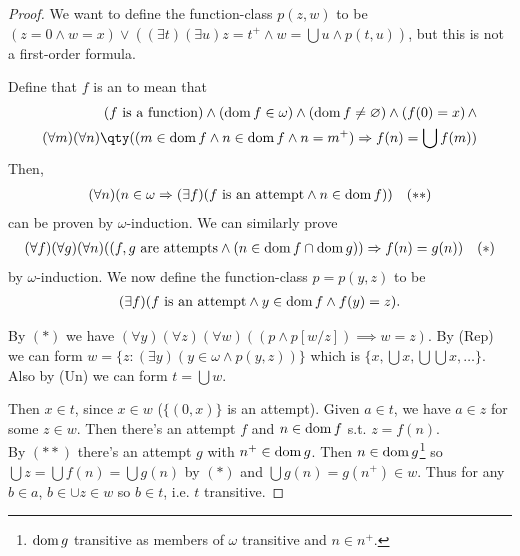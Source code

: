 \begin{proof}
    We want to define the function-class $p(z,w)$ to be $(z = 0 \wedge w = x) \vee ((\exists t)(\exists u) z = t^+ \wedge w = \bigcup u \wedge p(t,u))$, but this is not a first-order formula.

    Define that $f$ is an  to mean that
    \begin{align*}
        (f \text{ is a function}) \wedge (\dom f \in \omega) \wedge (\dom f \neq \varnothing) \wedge (f(0) = x)\, \wedge \\
        (\forall m)(\forall n)\qty((m \in \dom f \wedge n \in \dom f \wedge n = m^+) \implies f(n) = \bigcup f(m))
    \end{align*}
    Then,
    \begin{align*}
        (\forall n)(n \in \omega \Rightarrow (\exists f)(f \text{ is an attempt} \wedge n \in \operatorname{dom} f)) \quad (\ast\ast)
    \end{align*}
    can be proven by $\omega$-induction.
    We can similarly prove
    \begin{align*}
        (\forall f)(\forall g)(\forall n)((f, g \text{ are attempts} \wedge (n \in \operatorname{dom} f \cap \operatorname{dom} g)) \Rightarrow f(n) = g(n)) \quad (\ast)
    \end{align*}
    by $\omega$-induction.
    We now define the function-class $p = p(y, z)$ to be
    \begin{align*}
        (\exists f)(f \text{ is an attempt} \wedge y \in \operatorname{dom} f \wedge f(y) = z).
    \end{align*}

    By $(\ast)$ we have $(\forall y)(\forall z)(\forall w)((p \wedge p[w/z]) \implies w = z)$.
    By (Rep) we can form $w = \{z : (\exists y)(y \in \omega \wedge p(y, z))\}$ which is $\{x, \bigcup x, \bigcup \bigcup x, \dots\}$.
    Also by (Un) we can form $t = \bigcup w$.

    Then $x \in t$, since $x \in w$ ($\{(0, x)\}$ is an attempt).
    Given $a \in t$, we have $a \in z$ for some $z \in w$.
    Then there's an attempt $f$ and $n \in \operatorname{dom} f$ s.t. $z = f(n)$. \\
    By $(\ast\ast)$ there's an attempt $g$ with $n^+ \in \operatorname{dom} g$.
    Then $n \in \operatorname{dom} g$\footnote{$\operatorname{dom} g$ transitive as members of $\omega$ transitive and $n \in n^+$.} so $\bigcup z = \bigcup f(n) = \bigcup g(n)$ by $(\ast)$ and $\bigcup g(n) = g(n^+) \in w$.
    Thus for any $b \in a$, $b \in \cup z \in w$ so $b \in t$, i.e. $t$ transitive.
\end{proof}

